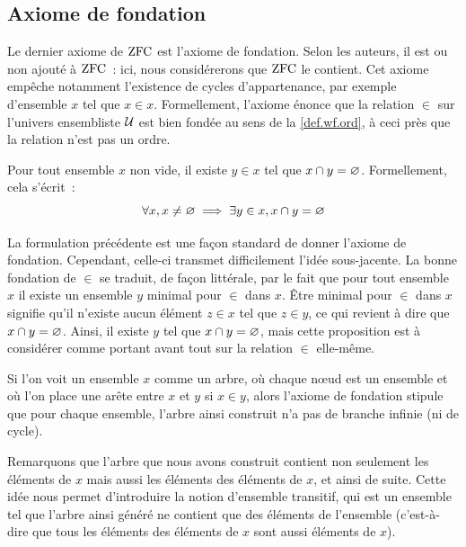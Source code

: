 \subsection{Axiome de fondation}

Le dernier axiome de $\operatorname{ZFC}$ est l'axiome de fondation. Selon les auteurs, il est
ou non ajouté à $\operatorname{ZFC}$~: ici, nous considérerons que $\operatorname{ZFC}$ le contient. Cet
axiome empêche notamment l'existence de cycles d'appartenance, par exemple
d'ensemble $x$ tel que
$x\in x$. Formellement, l'axiome énonce que la relation $\in$ sur l'univers
ensembliste $\mathcal{U}$ est bien fondée au sens de la \cref{def.wf.ord}, à ceci
près que la relation n'est pas un ordre.

\begin{axiom}[Fondation]\label{ax.ZF.AF}
  Pour tout ensemble $x$ non vide, il existe $y\in x$ tel que
  $x\cap y = \varnothing$. Formellement, cela s'écrit~:
  \[\forall x, x\neq\varnothing \implies \exists y \in x, x\cap y = \varnothing\]
\end{axiom}

\begin{remark}
  La formulation précédente est une façon standard de donner l'axiome de
  fondation. Cependant, celle-ci transmet difficilement l'idée sous-jacente.
  La bonne fondation de $\in$ se traduit, de façon littérale, par le fait que
  pour tout ensemble $x$ il existe un ensemble $y$ minimal pour $\in$ dans $x$.
  Être minimal pour $\in$ dans $x$ signifie qu'il n'existe aucun élément
  $z \in x$ tel que $z \in y$, ce qui revient à dire que $x \cap y = \varnothing$.
  Ainsi, il existe $y$ tel que $x \cap y = \varnothing$, mais cette proposition est à
  considérer comme portant avant tout sur la relation $\in$ elle-même.
\end{remark}

Si l'on voit un ensemble $x$ comme un arbre, où chaque n\oe ud est un ensemble
et où l'on place une arête entre $x$ et $y$ si $x\in y$, alors l'axiome de
fondation stipule que pour chaque ensemble, l'arbre ainsi construit n'a pas de
branche infinie (ni de cycle).

Remarquons que l'arbre que nous avons construit contient non seulement les
éléments de $x$ mais aussi les éléments des éléments de $x$, et ainsi de suite.
Cette idée nous permet d'introduire la notion d'ensemble transitif, qui est un
ensemble tel que l'arbre ainsi généré ne contient que des éléments de l'ensemble
(c'est-à-dire que tous les éléments des éléments de $x$ sont aussi éléments de
$x$).


